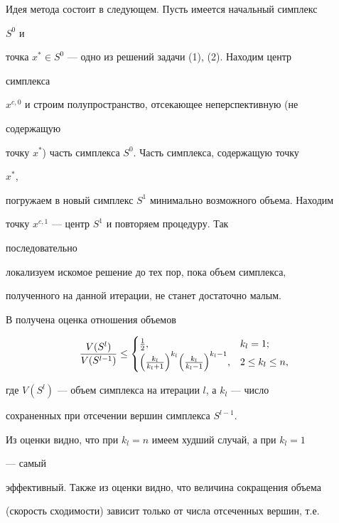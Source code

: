 Идея метода состоит в следующем. Пусть имеется начальный симплекс


$S^0$ и


точка $x^*\in S^0$ --- одно из решений задачи (1), (2). Находим центр


симплекса


$x^{c,0}$ и строим полупространство, отсекающее неперспективную (не


содержащую


точку $x^*$) часть симплекса $S^0$. Часть симплекса, содержащую точку


$x^*$,


погружаем в новый симплекс $S^1$ минимально возможного объема. Находим


точку $x^{c,1}$ --- центр $S^1$ и повторяем процедуру. Так


последовательно


локализуем искомое решение до тех пор, пока объем симплекса,


полученного на данной итерации, не станет достаточно малым.





В \cite{An} получена оценка отношения объемов


\begin{equation}


\frac{V(S^l)}{V(S^{l-1})}\le


\begin{cases}


\frac{1}{2}, & k_l=1;\\


\Bigl(\frac{k_l}{k_l+1}\Bigr)^{k_l}


\Bigl(\frac{k_l}{k_l-1}\Bigr)^{k_l-1}, & 2\le k_l\le n,


\end{cases}


\end{equation}


где $V(S^l)$ --- объем симплекса на итерации $l$, а $k_l$ --- число


сохраненных при отсечении вершин симплекса $S^{l-1}$.





Из оценки видно, что при $k_l=n$ имеем худший случай, а при $k_l=1$


--- самый


эффективный. Также из оценки видно, что величина сокращения объема


(скорость сходимости) зависит только от числа отсеченных вершин, т.е.


